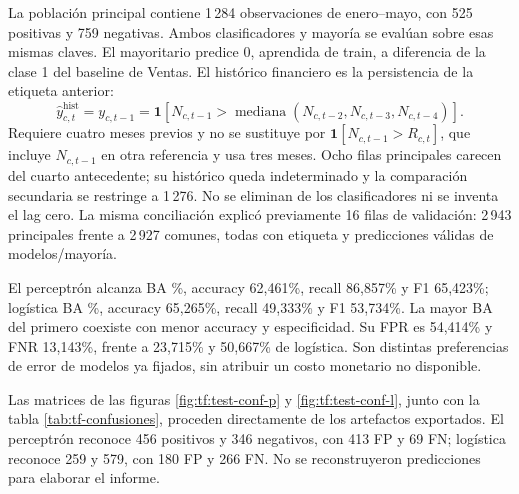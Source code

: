 La población principal contiene 1\,284 observaciones de enero--mayo, con 525 positivas y 759 negativas. Ambos clasificadores y mayoría se evalúan sobre esas mismas claves. El mayoritario predice 0, aprendida de train, a diferencia de la clase 1 del baseline de Ventas. El histórico financiero es la persistencia de la etiqueta anterior:
\begin{equation}
\widehat y^{\mathrm{hist}}_{c,t}=y_{c,t-1}
=\mathbf1[N_{c,t-1}>\operatorname{mediana}(N_{c,t-2},N_{c,t-3},N_{c,t-4})].\label{eq:tf-historico}
\end{equation}
Requiere cuatro meses previos y no se sustituye por $\mathbf1[N_{c,t-1}>R_{c,t}]$, que incluye $N_{c,t-1}$ en otra referencia y usa tres meses. Ocho filas principales carecen del cuarto antecedente; su histórico queda indeterminado y la comparación secundaria se restringe a 1\,276. No se eliminan de los clasificadores ni se inventa el lag cero. La misma conciliación explicó previamente 16 filas de validación: 2\,943 principales frente a 2\,927 comunes, todas con etiqueta y predicciones válidas de modelos/mayoría.


El perceptrón alcanza BA \TFBAPTest\%, accuracy 62,461\%, recall 86,857\% y F1 65,423\%; logística BA \TFBALTest\%, accuracy 65,265\%, recall 49,333\% y F1 53,734\%. La mayor BA del primero coexiste con menor accuracy y especificidad. Su FPR es 54,414\% y FNR 13,143\%, frente a 23,715\% y 50,667\% de logística. Son distintas preferencias de error de modelos ya fijados, sin atribuir un costo monetario no disponible.

Las matrices de las figuras \ref{fig:tf:test-conf-p} y \ref{fig:tf:test-conf-l}, junto con la tabla \ref{tab:tf-confusiones}, proceden directamente de los artefactos exportados. El perceptrón reconoce 456 positivos y 346 negativos, con 413 FP y 69 FN; logística reconoce 259 y 579, con 180 FP y 266 FN. No se reconstruyeron predicciones para elaborar el informe.


